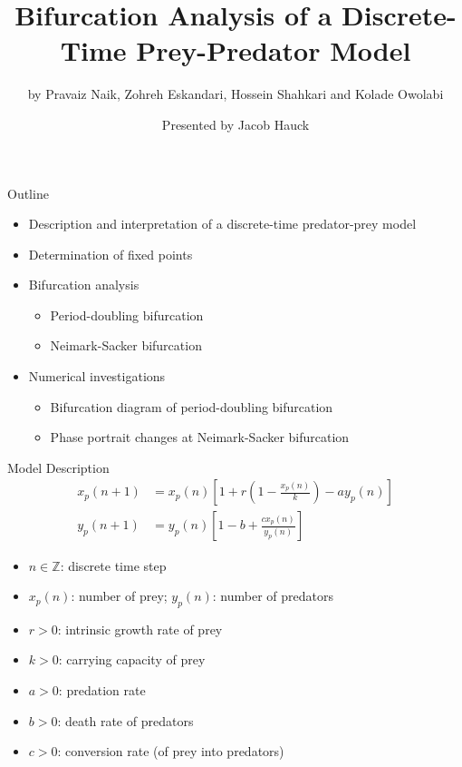 \documentclass[]{beamer}
\title{Bifurcation Analysis of a Discrete-Time Prey-Predator Model}
\author{by Pravaiz Naik, Zohreh Eskandari, Hossein Shahkari and Kolade Owolabi}
\institute{24 April 2024}
\date{Presented by Jacob Hauck}
\begin{document}
	\frame{\titlepage}
	
	\begin{frame}{Outline}
		\begin{itemize}
			\item Description and interpretation of a discrete-time predator-prey model
			\vfill
			\pause
			
			\item Determination of fixed points
			\vfill
			\pause
			
			\item Bifurcation analysis
			\begin{itemize}
				\item Period-doubling bifurcation
				\item Neimark-Sacker bifurcation
			\end{itemize}
			\vfill
			\pause
			
			\item Numerical investigations
			\begin{itemize}
				\item Bifurcation diagram of period-doubling bifurcation
				\item Phase portrait changes at Neimark-Sacker bifurcation
			\end{itemize}
		\end{itemize}
	\end{frame}
	
	\begin{frame}{Model Description}
		\begin{align*}
			x_p(n+1) &= x_p(n)\left[1 + r\left(1 - \frac{x_p(n)}{k}\right) - ay_p(n)\right] \\[0.3em]
			y_p(n+1) &= y_p(n)\left[1 - b + \frac{cx_p(n)}{y_p(n)}\right]
		\end{align*}
		\begin{itemize}
			\item $n \in \mathbb{Z}$: discrete time step
			\pause
			\item $x_p(n)$: number of prey; $y_p(n)$: number of predators
			\pause
			\item $r > 0$: intrinsic growth rate of prey
			\pause
			\item $k > 0$: carrying capacity of prey
			\pause
			\item $a > 0$: predation rate
			\pause
			\item $b > 0$: death rate of predators
			\pause
			\item $c > 0$: conversion rate (of prey into predators)
		\end{itemize}
	\end{frame}
	
\end{document}
